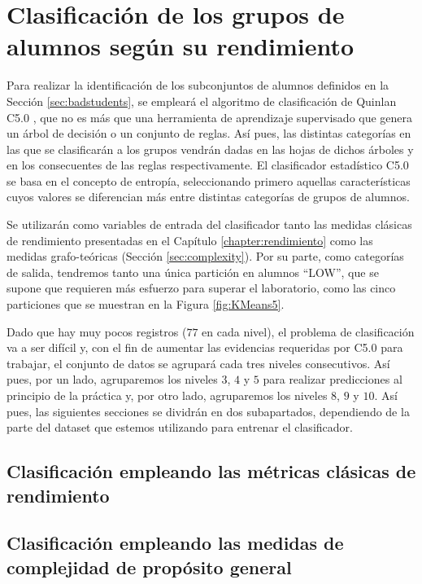 \chapter{Clasificación de los grupos de alumnos según su rendimiento}\label{sec:chapterXIII}

Para realizar la identificación de los subconjuntos de alumnos definidos en la Sección \ref{sec:badstudents}, se empleará el algoritmo de clasificación de Quinlan C5.0 \cite{Quinlan:See5C5}, que no es más que una herramienta de aprendizaje supervisado que genera un árbol de decisión o un conjunto de reglas. Así pues, las distintas categorías en las que se clasificarán a los grupos vendrán dadas en las hojas de dichos árboles y en los consecuentes de las reglas respectivamente. El clasificador estadístico C5.0 se basa en el concepto de entropía, seleccionando primero aquellas características cuyos valores se diferencian más entre distintas categorías de grupos de alumnos.

Se utilizarán como variables de entrada del clasificador tanto las medidas clásicas de rendimiento presentadas en el Capítulo \ref{chapter:rendimiento} como las medidas grafo-teóricas (Sección \ref{sec:complexity}). Por su parte, como categorías de salida, tendremos tanto una única partición en alumnos ``LOW'', que se supone que requieren más esfuerzo para superar el laboratorio, como las cinco particiones que se muestran en la Figura \ref{fig:KMeans5}.

Dado que hay muy pocos registros ($77$ en cada nivel), el problema de clasificación va a ser difícil y, con el fin de aumentar las evidencias requeridas por C5.0 para trabajar, el conjunto de datos se agrupará cada tres niveles consecutivos. Así pues, por un lado, agruparemos los niveles $3$, $4$ y $5$ para realizar predicciones al principio de la práctica y, por otro lado, agruparemos los niveles $8$, $9$ y $10$. Así pues, las siguientes secciones se dividrán en dos subapartados, dependiendo de la parte del dataset que estemos utilizando para entrenar el clasificador.

\section{Clasificación empleando las métricas clásicas de rendimiento}



\section{Clasificación empleando las medidas de complejidad de propósito general}

